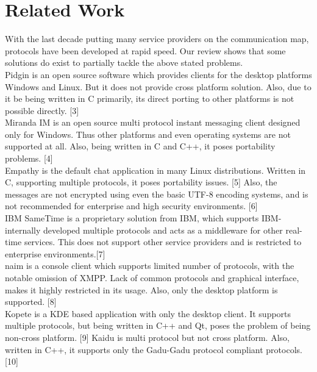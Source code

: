 \documentclass{SureshLimkar}
\begin{document}
\section {Related Work}
\hspace{0.5 in}With the last decade putting many service providers on the communication map, protocols have been developed at rapid speed. Our review shows that some solutions do exist to partially tackle the above stated problems.\\
\hspace{0.5 in} Pidgin is an open source software which provides clients for the desktop platforms Windows and Linux. But it does not provide cross platform solution. Also, due to it be being written in C primarily, its direct porting to other platforms is not possible directly. [3]\\
\hspace{0.5 in}Miranda IM is an open source multi protocol instant messaging client designed only for Windows. Thus other platforms and even operating systems are not supported at all. Also, being written in C and C++, it poses portability problems. [4]\\
\hspace{0.5 in}Empathy is the default chat application in many Linux distributions. Written in C, supporting multiple protocols, it poses portability issues. [5] Also, the messages are not encrypted using even the basic UTF-8 encoding systems, and is not recommended for enterprise and high security environments. [6]\\
\hspace{0.5 in}IBM SameTime is a proprietary solution from IBM, which supports IBM-internally developed multiple protocols and acts as a middleware for other real-time services. This does not support other service providers and is restricted to enterprise environments.[7]\\
\hspace{0.5 in}naim is a console client which supports limited number of protocols, with the notable omission of XMPP. Lack of common protocols and graphical interface, makes it highly restricted in its usage. Also, only the desktop platform is supported. [8]\\
\hspace{0.5 in}Kopete is a KDE based application with only the desktop client. It supports multiple protocols, but being written in C++ and Qt, poses the problem of being  non-cross platform. [9]
\hspace{0.5 in}Kaidu is multi protocol but not cross platform. Also, written in C++, it supports only the Gadu-Gadu protocol compliant protocols.[10]\\
\end{document}
